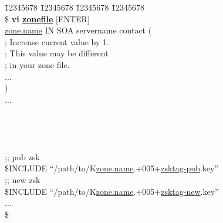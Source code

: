 \begin{tabbing}
\hspace{0.5in} \= 12345678 \= 12345678 \= 12345678 \= 12345678 \kill \\
\hspace{0.5in}\$ {\bf vi \underline{zonefile}} $[$ENTER$]$ \\
\hspace{0.5in}\underline{zone.name}        IN     SOA        servername contact ( \\
\hspace{3.5in}{\bf 2005092106} ; Increase current value by 1. \\
\hspace{4.4in};  This value may be different \\
\hspace{4.4in}; in your zone file. \\
\hspace{0.5in}\>           \>         ... \\
\hspace{0.5in}\>              ) \\
\hspace{0.5in}... \\
 \\
 \\
\hspace{0.5in}{\bf ;; new ksk} \\
 \\
\hspace{0.5in};; pub zsk \\
\hspace{0.5in}\$INCLUDE ``/path/to/K\underline{zone.name}.+005+\underline{zsktag-pub}.key'' \\
\hspace{0.5in};; new zsk \\
\hspace{0.5in}\$INCLUDE ``/path/to/K\underline{zone.name}.+005+\underline{zsktag-new}.key'' \\
\hspace{0.5in}... \\
\hspace{0.5in}\$ \\
\end{tabbing}

